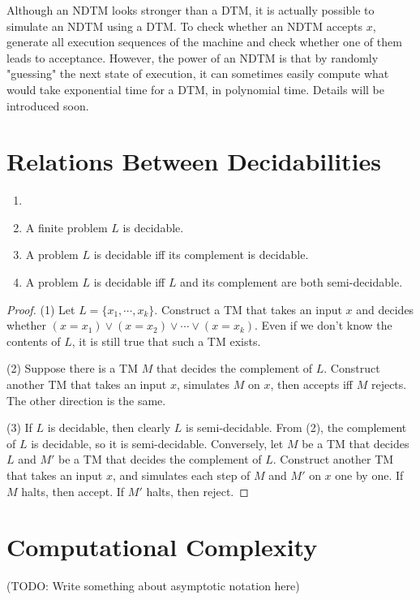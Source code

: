 	Although an NDTM looks stronger than a DTM, it is actually possible to simulate an NDTM using a DTM. To check whether an NDTM accepts $x$, generate all execution sequences of the machine and check whether one of them leads to acceptance. However, the power of an NDTM is that by randomly "guessing" the next state of execution, it can sometimes easily compute what would take exponential time for a DTM, in polynomial time. Details will be introduced soon.
	
	\section{Relations Between Decidabilities}
	
	\begin{thm} \label{thm_decidabilities} \begin{enumerate} \item[]
	    \item A finite problem $L$ is decidable.
	    \item A problem $L$ is decidable iff its complement is decidable.
	    \item A problem $L$ is decidable iff $L$ and its complement are both semi-decidable.
	\end{enumerate} \end{thm}
	
	\begin{proof}
	    (1) Let $L=\{x_1, \cdots, x_k\}$. Construct a TM that takes an input $x$ and decides whether $(x=x_1)\vee(x=x_2)\vee\cdots\vee(x=x_k)$. Even if we don't know the contents of $L$, it is still true that such a TM exists.
	    
	    (2) Suppose there is a TM $M$ that decides the complement of $L$. Construct another TM that takes an input $x$, simulates $M$ on $x$, then accepts iff $M$ rejects. The other direction is the same.
	    
	    (3) If $L$ is decidable, then clearly $L$ is semi-decidable. From (2), the complement of $L$ is decidable, so it is semi-decidable. Conversely, let $M$ be a TM that decides $L$ and $M'$ be a TM that decides the complement of $L$. Construct another TM that takes an input $x$, and simulates each step of $M$ and $M'$ on $x$ one by one. If $M$ halts, then accept. If $M'$ halts, then reject.
	\end{proof}

    \section{Computational Complexity}
    (TODO: Write something about asymptotic notation here)
        

